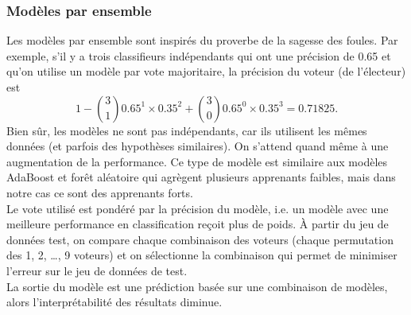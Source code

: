 \subsubsection{Modèles par ensemble}

Les modèles par ensemble sont inspirés du proverbe de la sagesse des foules. Par exemple, s'il y a trois classifieurs indépendants qui ont une précision de 0.65 et qu'on utilise un modèle par vote majoritaire, la précision du voteur (de l'électeur) est 
$$1 - \binom{3}{1}0.65^1\times 0.35^2 + \binom{3}{0}0.65^0\times 0.35^3 = 0.71825.$$
Bien sûr, les modèles ne sont pas indépendants, car ils utilisent les mêmes données (et parfois des hypothèses similaires). On s'attend quand même à une augmentation de la performance. Ce type de modèle est similaire aux modèles AdaBoost et forêt aléatoire qui agrègent plusieurs apprenants faibles, mais dans notre cas ce sont des apprenants forts.\\

Le vote utilisé est pondéré par la précision du modèle, i.e. un modèle avec une meilleure performance en classification reçoit plus de poids. À partir du jeu de données test, on compare chaque combinaison des voteurs (chaque permutation des 1, 2, \dots, 9 voteurs) et on sélectionne la combinaison qui permet de minimiser l'erreur sur le jeu de données de test.\\

La sortie du modèle est une prédiction basée sur une combinaison de modèles, alors l'interprétabilité des résultats diminue.
